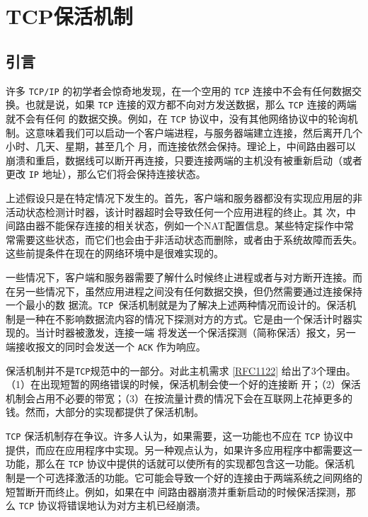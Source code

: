 \chapter{TCP保活机制}
\minitoc

\section{引言}
许多 \verb|TCP/IP| 的初学者会惊奇地发现，在一个空用的 \verb|TCP| 连接中不会有任何数据交换。也就是说，如果 \verb|TCP| 连接的双方都不向对方发送数据，那么 \verb|TCP| 连接的两端就不会有任何
的数据交换。例如，在 \verb|TCP| 协议中，没有其他网络协议中的轮询机制。这意味着我们可以启动一个客户端进程，与服务器端建立连接，然后离开几个小时、几天、星期，甚至几个
月，而连接依然会保持。理论上，中间路由器可以崩溃和重启，数据线可以断开再连接，只要连接两端的主机没有被重新启动（或者更改 \verb|IP| 地址），那么它们将会保持连接状态。

\begin{tcolorbox}
    上述假设只是在特定情况下发生的。首先，客户端和服务器都没有实现应用层的非活动状态检测计时器，该计时器超时会导致任何一个应用进程的终止。其
    次，中间路由器不能保存连接的相关状态，例如一个NAT配置信息。某些特定採作中常常需要这些状态，而它们也会由于非活动状态而删除，或者由于系统故障而丢失。
    这些前提条件在现在的网络环境中是很难实现的。
\end{tcolorbox}

一些情况下，客户端和服务器需要了解什么时候终止进程或者与对方断开连接。而在另一些情况下，虽然应用进程之间没有任何数据交换，但仍然需要通过连接保持一个最小的数
据流。\verb|TCP |保活机制就是为了解决上述两种情况而设计的。保活机制是一种在不影响数据流内容的情况下探测对方的方式。它是由一个保活计时器实现的。当计时器被激发，连接一端
将发送一个保活探测（简称保活）报文，另一端接收报文的同时会发送一个 \verb|ACK| 作为响应。

\begin{tcolorbox}
    保活机制并不是\verb|TCP|规范中的一部分。对此主机需求 \href{https://www.rfc-editor.org/rfc/rfc1122}{[RFC1122]} 给出了3个理由。（1）在出现短暂的网络错误的时候，保活机制会使一个好的连接断
    开；（2）保活机制会占用不必要的带宽；（3）在按流量计费的情况下会在互联网上花掉更多的钱。然而，大部分的实现都提供了保活机制。
\end{tcolorbox}

\verb|TCP| 保活机制存在争议。许多人认为，如果需要，这一功能也不应在 \verb|TCP| 协议中提供，而应在应用程序中实现。另一种观点认为，如果许多应用程序中都需要这一功能，那么在
\verb|TCP| 协议中提供的话就可以使所有的实现都包含这一功能。保活机制是一个可选择激活的功能。它可能会导致一个好的连接由于两端系统之间网络的短暂断开而终止。例如，如果在中
间路由器崩溃并重新启动的时候保活探测，那么 \verb|TCP| 协议将错误地认为对方主机已经崩溃。

